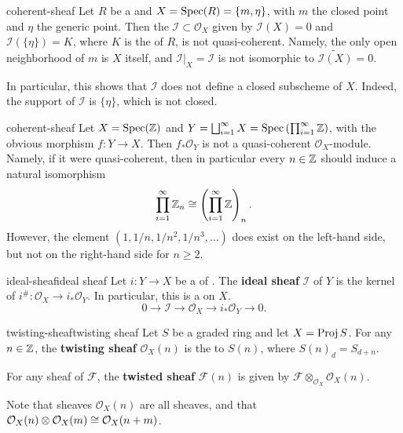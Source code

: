 \begin{example}{coherent-sheaf}
    Let $R$ be a  and $X = \operatorname{Spec}(R) = \{ m, \eta \}$, with $m$ the closed point and $\eta$ the generic point. Then the  $\mathcal{I} \subset \mathcal{O}_X$ given by $\mathcal{I}(X) = 0$ and $\mathcal{I}(\{ \eta \}) = K$, where $K$ is the  of $R$, is not quasi-coherent. Namely, the only open neighborhood of $m$ is $X$ itself, and $\mathcal{I}|_X = \mathcal{I}$ is not isomorphic to $\widetilde{\mathcal{I}(X)} = 0$.
    
    In particular, this shows that $\mathcal{I}$ does not define a closed subscheme of $X$. Indeed, the support of $\mathcal{I}$ is $\{ \eta \}$, which is not closed.
\end{example}

\begin{example}{coherent-sheaf}
    Let $X = \operatorname{Spec}(\mathbb{Z})$ and $Y = \bigsqcup_{i = 1}^{\infty} X = \operatorname{Spec}\left(\prod_{i = 1}^\infty \mathbb{Z} \right)$, with the obvious morphism $f \colon Y \to X$. Then $f_* \mathcal{O}_Y$ is not a quasi-coherent $\mathcal{O}_X$-module. Namely, if it were quasi-coherent, then in particular every $n \in \mathbb{Z}$ should induce a natural isomorphism
    \[ \prod_{i = 1}^{\infty} \mathbb{Z}_n \cong \left(\prod_{i = 1}^{\infty} \mathbb{Z} \right)_n . \]
    However, the element $(1, 1/n, 1/n^2, 1/n^3, \ldots)$ does exist on the left-hand side, but not on the right-hand side for $n \ge 2$.
\end{example}

\begin{topic}{ideal-sheaf}{ideal sheaf}
    Let $i \colon Y \to X$ be a  of . The \textbf{ideal sheaf} $\mathcal{I}$ of $Y$ is the kernel of $i^\# \colon \mathcal{O}_X \to i_* \mathcal{O}_Y$. In particular, this is a  on $X$.
    \[ 0 \to \mathcal{I} \to \mathcal{O}_X \to i_* \mathcal{O}_Y \to 0 . \]
\end{topic}

\begin{topic}{twisting-sheaf}{twisting sheaf}
    Let $S$ be a graded ring and let $X = \operatorname{Proj} S$. For any $n \in \mathbb{Z}$, the \textbf{twisting sheaf} $\mathcal{O}_X(n)$ is the  to $S(n)$, where $S(n)_d = S_{d + n}$.
    
    For any sheaf of  $\mathcal{F}$, the \textbf{twisted sheaf} $\mathcal{F}(n)$ is given by $\mathcal{F} \otimes_{\mathcal{O}_X} \mathcal{O}_X(n)$.
    
    Note that sheaves $\mathcal{O}_X(n)$ are all  sheaves, and that $\mathcal{O}_X(n) \otimes \mathcal{O}_X(m) \cong \mathcal{O}_X(n + m)$.
\end{topic}

